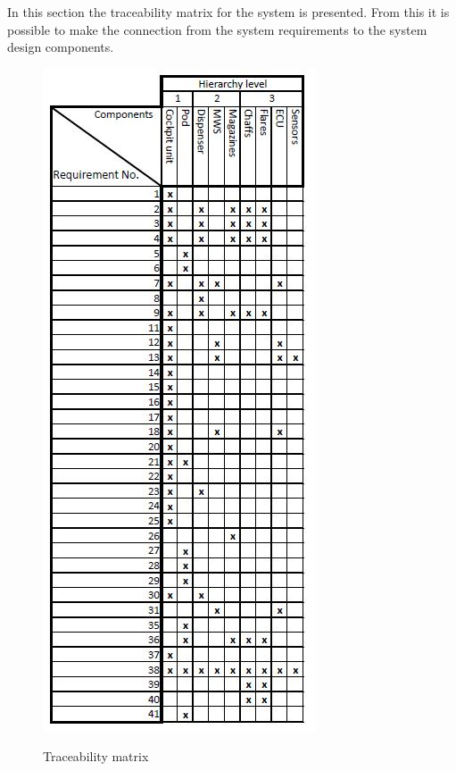 In this section the traceability matrix for the system  is presented. From this it is possible to make the connection from the system requirements to the system design components.

\begin{figure}[h]
\centering
\includegraphics[scale=0.90]{./images/TraceabilityMatrix.JPG}\\
\caption{Traceability matrix}
\label{fig:traceabilityMatrix}
\end{figure}


